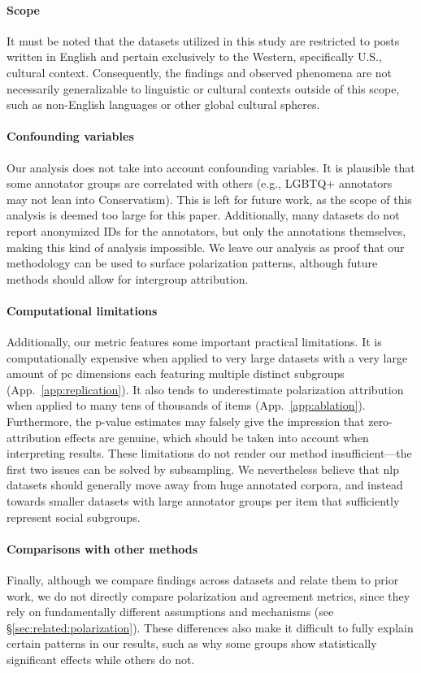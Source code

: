\documentclass[11pt]{article}
\theoremstyle{definition}
\theoremstyle{plain}
\begin{document}
\paragraph{Scope} It must be noted that the datasets utilized in this study are restricted to posts written in English and pertain exclusively to the Western, specifically U.S., cultural context. Consequently, the findings and observed phenomena are not necessarily generalizable to linguistic or cultural contexts outside of this scope, such as non-English languages or other global cultural spheres.

\paragraph{Confounding variables} Our analysis does not take into account confounding variables. It is plausible that some annotator groups are correlated with others (e.g., LGBTQ+ annotators may not lean into Conservatism). This is left for future work, as the scope of this analysis is deemed too large for this paper. Additionally, many datasets do not report anonymized IDs for the annotators, but only the annotations themselves, making this kind of analysis impossible. We leave our analysis as proof that our methodology can be used to surface polarization patterns, although future methods should allow for intergroup attribution.

\paragraph{Computational limitations} Additionally, our metric features some important practical limitations. It is computationally expensive when applied to very large datasets with a very large amount of \ac{pc} dimensions each featuring multiple distinct subgroups (App.~\ref{app:replication}). It also tends to underestimate polarization attribution when applied to many tens of thousands of items (App.~\ref{app:ablation}). Furthermore, the p-value estimates may falsely give the impression that zero-attribution effects are genuine, which should be taken into account when interpreting results. These limitations do not render our method insufficient---the first two issues can be solved by subsampling. We nevertheless believe that \ac{nlp} datasets should generally move away from huge annotated corpora, and instead towards smaller datasets with large annotator groups per item that sufficiently represent social subgroups.

\paragraph{Comparisons with other methods} Finally, although we compare findings across datasets and relate them to prior work, we do not directly compare polarization and agreement metrics, since they rely on fundamentally different assumptions and mechanisms (see \S\ref{sec:related:polarization}). These differences also make it difficult to fully explain certain patterns in our results, such as why some groups show statistically significant effects while others do not.
\end{document}
